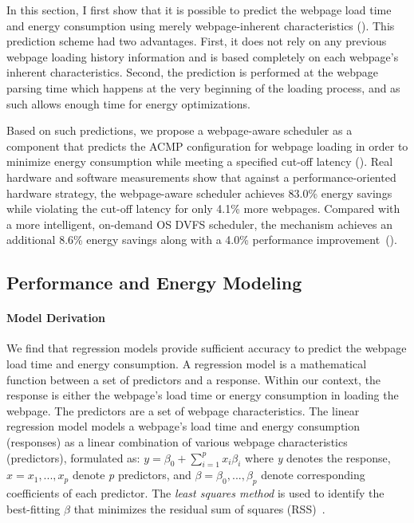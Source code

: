 In this section, I first show that it is possible to predict the webpage load time and energy consumption using merely webpage-inherent characteristics (). This prediction scheme had two advantages. First, it does not rely on any previous webpage loading history information and is based completely on each webpage's inherent characteristics. Second, the prediction is performed at the webpage parsing time which happens at the very beginning of the loading process, and as such allows enough time for energy optimizations.

Based on such predictions, we propose a webpage-aware scheduler as a \webrt component that predicts the ACMP configuration for webpage loading in order to minimize energy consumption while meeting a specified cut-off latency (). Real hardware and software measurements show that against a performance-oriented hardware strategy, the webpage-aware scheduler achieves 83.0\% energy savings while violating the cut-off latency for only 4.1\% more webpages. Compared with a more intelligent, on-demand OS DVFS scheduler, the mechanism achieves an additional 8.6\% energy savings along with a 4.0\% performance improvement~().

\subsection{Performance and Energy Modeling}
\label{sec:runtime:load:model}



\paragraph{Model Derivation} We find that regression models provide sufficient accuracy to predict the webpage load time and energy consumption. A regression model is a mathematical function between a set of predictors and a response. Within our context, the response is either the webpage's load time or energy consumption in loading the webpage. The predictors are a set of webpage characteristics. The linear regression model models a webpage's load time and energy consumption (responses) as a linear combination of various webpage characteristics (predictors), formulated as: $y = \beta_0 + \sum_{i=1}^{p} x_i \beta_i$ where \textit{y} denotes the response, \textit{$x = x_{1},...,x_{p}$} denote \textit{p} predictors, and \textit{$\beta = \beta_{0},...,\beta_{p}$} denote corresponding coefficients of each predictor. The \textit{least squares method} is used to identify the best-fitting $\beta$ that minimizes the residual sum of squares (RSS)~\cite{ESL}.

